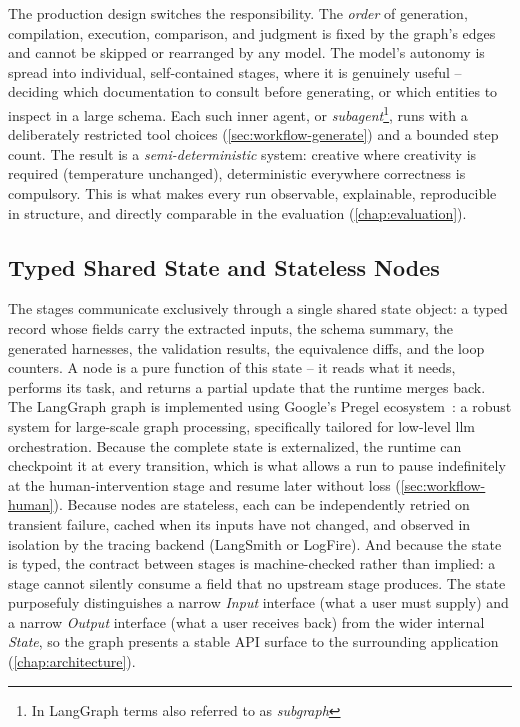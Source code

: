 The production design switches the responsibility. The \emph{order} of generation, compilation, execution, comparison, and judgment is fixed by the graph's edges and cannot be skipped or rearranged by any model. The model's autonomy is spread into individual, self-contained stages, where it is genuinely useful -- deciding which documentation to consult before generating, or which entities to inspect in a large schema. Each such inner agent, or \emph{subagent}\footnote{In LangGraph terms also referred to as \emph{subgraph}}, runs with a deliberately restricted tool choices (\cref{sec:workflow-generate}) and a bounded step count. The result is a \emph{semi-deterministic} system: creative where creativity is required (temperature unchanged), deterministic everywhere correctness is compulsory. This is what makes every run observable, explainable, reproducible in structure, and directly comparable in the evaluation (\cref{chap:evaluation}).

\subsection{Typed Shared State and Stateless Nodes}
\label{sec:design-state}

The stages communicate exclusively through a single shared state object: a typed record whose fields carry the extracted inputs, the schema summary, the generated harnesses, the validation results, the equivalence diffs, and the loop counters. A node is a pure function of this state -- it reads what it needs, performs its task, and returns a partial update that the runtime merges back. The LangGraph graph is implemented using Google's Pregel ecosystem~\cite{google-pregel}: a robust system for large-scale graph processing, specifically tailored for low-level \acrshort{llm} orchestration. Because the complete state is externalized, the runtime can checkpoint it at every transition, which is what allows a run to pause indefinitely at the human-intervention stage and resume later without loss (\cref{sec:workflow-human}). Because nodes are stateless, each can be independently retried on transient failure, cached when its inputs have not changed, and observed in isolation by the tracing backend (LangSmith or LogFire). And because the state is typed, the contract between stages is machine-checked rather than implied: a stage cannot silently consume a field that no upstream stage produces. The state purposefuly distinguishes a narrow \emph{Input} interface (what a user must supply) and a narrow \emph{Output} interface (what a user receives back) from the wider internal \emph{State}, so the graph presents a stable API surface to the surrounding application (\cref{chap:architecture}).

